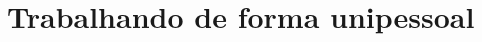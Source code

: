 \documentclass[12pt]{extbook} %
\begin{document}
\part{Trabalhando de forma unipessoal}








\end{document}
